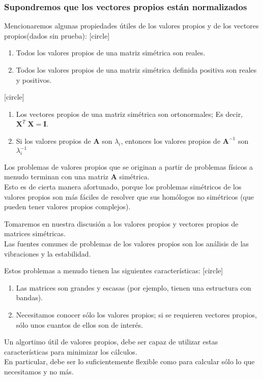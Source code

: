 \begin{frame}
\frametitle{Supondremos que los vectores propios están normalizados}
Mencionaremos algunas propiedades útiles de los valores propios y de los vectores propios(dados sin prueba):
[circle]
\begin{enumerate}[<+->]
\item Todos los valores propios de una matriz simétrica son reales.
\item Todos los valores propios de una matriz simétrica definida positiva son reales y positivos.
\seti
\end{enumerate}
\end{frame}
\begin{frame}
[circle]
\begin{enumerate}[<+->]
\conti
\item Los vectores propios de una matriz simétrica son ortonormales; Es decir, $\mathbf{X}^{T} \; \mathbf{X} = \mathbf{I}$.
\item Si los valores propios de $\mathbf{A}$ son $\lambda_{i}$, entonces los valores propios de $\mathbf{A}^{-1}$ son $\lambda_{i}^{-1}$
\end{enumerate}
\end{frame}
\begin{frame}
Los problemas de valores propios que se originan a partir de problemas físicos a menudo terminan con una matriz $\mathbf{A}$ simétrica.
\\
\bigskip
Esto es de cierta manera afortunado, porque los problemas simétricos de los valores propios son más fáciles de resolver que sus homólogos no simétricos (que pueden tener valores propios complejos).
\end{frame}
\begin{frame}
Tomaremos en nuestra discusión a los valores propios y vectores propios de matrices simétricas.
\\
\bigskip
Las fuentes comunes de problemas de los valores propios son los análisis de las vibraciones y la estabilidad.
\end{frame}
\begin{frame}
Estos problemas a menudo tienen las siguientes características:
[circle]
\begin{enumerate}[<+->]
\item Las matrices son grandes y escasas (por ejemplo, tienen una estructura con bandas).
\item Necesitamos conocer sólo los valores propios; si se requieren vectores propios, sólo unos cuantos de ellos son de interés.
\end{enumerate}
\end{frame}
\begin{frame}
Un algortimo útil de valores propios, debe ser capaz de utilizar estas características para minimizar los cálculos.
\\
\bigskip
En particular, debe ser lo suficientemente flexible como para calcular sólo lo que necesitamos y no más.
\end{frame}

